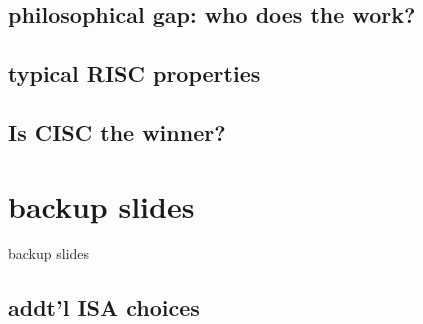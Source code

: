 


\subsection{philosophical gap: who does the work?}

\subsection{typical RISC properties}




\subsection{Is CISC the winner?}





\section{backup slides}
\begin{frame}{backup slides}
\end{frame}

\subsection{addt'l ISA choices}




